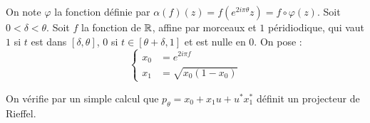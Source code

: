 On note $\varphi$ la fonction définie par $\alpha (f) (z) = f(e^{2i\pi\theta}z)=f\circ \varphi (z)$.
Soit $0<\delta<\theta$. Soit $f$ la fonction de $\mathbb R$, affine par morceaux et $1$ péridiodique, qui vaut $1$ si $t$ est dans $[\delta, \theta]$, $0$ si $t\in [\theta+\delta,1]$ et est nulle en $0$. On pose : 
\[\left\{ \begin{array}{rl}x_0& =e^{2i\pi f }\\
				x_1 &= \sqrt{x_0(1-x_0)}
\end{array}\right.\]  

On vérifie par un simple calcul que $p_\theta=x_0+x_1 u +u^*x_1^*$ définit un projecteur de Rieffel.

